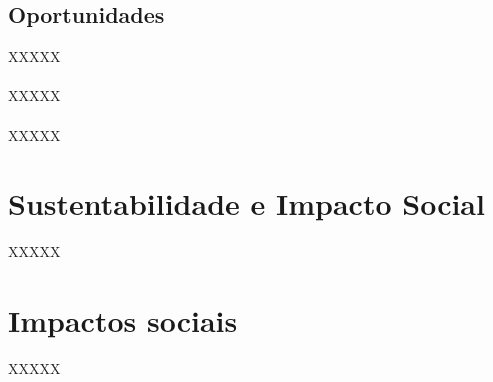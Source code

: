 \subsection{Oportunidades}

XXXXX
\\\\
XXXXX
\\\\
XXXXX


\section{Sustentabilidade e Impacto Social}

XXXXX




\section{Impactos sociais}

XXXXX
